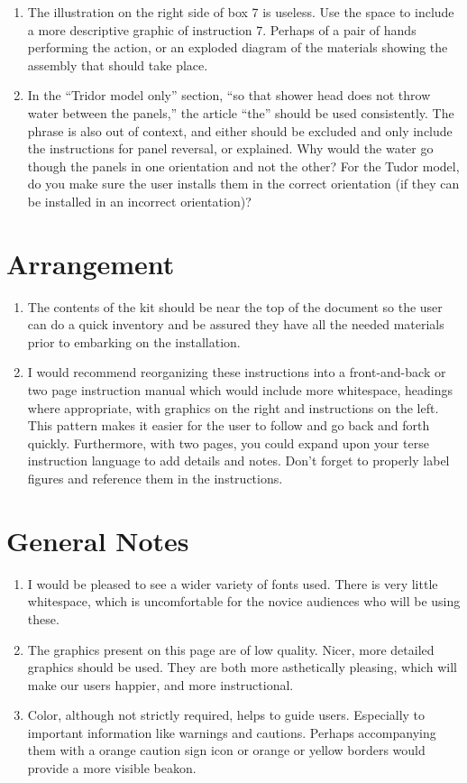 \documentclass[11pt]{article}
\begin{document}
\begin{enumerate}
	\item{
		The illustration on the right side of box 7 is useless. Use the space to include a more descriptive graphic of instruction 7. Perhaps of a pair of hands performing the action, or an exploded diagram of the materials showing the assembly that should take place.
	}
	\item{
		In the ``Tridor model only'' section, ``so that shower head does not throw water between the panels,'' the article ``the'' should be used consistently. The phrase is also out of context, and either should be excluded and only include the instructions for panel reversal, or explained. Why would the water go though the panels in one orientation and not the other? For the Tudor model, do you make sure the user installs them in the correct orientation (if they can be installed in an incorrect orientation)?
	}
\end{enumerate}

\section{Arrangement}

\begin{enumerate}
	\item{
		The contents of the kit should be near the top of the document so the user can do a quick inventory and be assured they have all the needed materials prior to embarking on the installation.
	}
	\item{
		I would recommend reorganizing these instructions into a front-and-back or two page instruction manual which would include more whitespace, headings where appropriate,  with graphics on the right and instructions on the left.
		This pattern makes it easier for the user to follow and go back and forth quickly. Furthermore, with two pages, you could expand upon your terse instruction language to add details and notes.
		Don't forget to properly label figures and reference them in the instructions.
	}
\end{enumerate}

\section{General Notes}

\begin{enumerate}
	\item{
		I would be pleased to see a wider variety of fonts used. There is very little whitespace, which is uncomfortable for the novice audiences who will be using these.
	}
	\item{
		The graphics present on this page are of low quality. Nicer, more detailed graphics should be used. They are both more asthetically pleasing, which will make our users happier, and more instructional.
	}
	\item{
		Color, although not strictly required, helps to guide users. Especially to important information like warnings and cautions. Perhaps accompanying them with a orange caution sign icon or orange or yellow borders would provide a more visible beakon.
	}
\end{enumerate}
\end{document}
